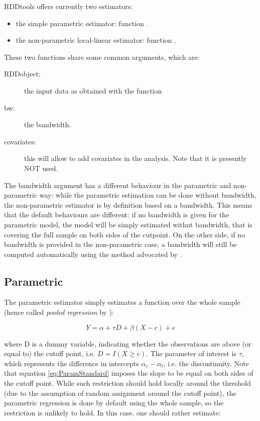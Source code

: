 \documentclass[english,nojss]{jss}\usepackage{graphicx, color}
\begin{document}

RDDtools offers currently two estimators:
\begin{itemize}
\item the simple parametric estimator: function . 
\item the non-parametric local-linear estimator: function . 
\end{itemize}
These two functions share some common arguments, which are:
\begin{description}
\item [{RDDobject:}] the input data as obtained with the 
function
\item [{bw:}] the bandwidth. 
\item [{covariates:}] this will allow to add covariates in the analysis.
Note that it is presently NOT used. 
\end{description}
The bandwidth argument has a different behaviour in the parametric
and non-parametric way: while the parametric estimation can be done
without bandwidth, the non-parametric estimator is by definition based
on a bandwidth. This means that the default behaviours are different:
if no bandwidth is given for the parametric model, the model will
be simply estimated withut bandwidth, that is covering the full sample
on both sides of the cutpoint. On the other side, if no bandwidth
is provided in the non-parametric case, a bandwidth will still be
computed automatically using the method advocated by \citet{ImbensKalyanaraman2012}. 


\subsection{Parametric}

The parametric estimator simply estimates a function over the whole
sample (hence called \emph{pooled regression} by \citealp{LeeLemieux2010}):

\begin{equation}
Y=\alpha+\tau D+\beta(X-c)+\epsilon\label{eq:ParamStandard}
\end{equation}


where D is a dummy variable, indicating whether the observations are
above (or equal to) the cutoff point, i.e. $D=I(X\geq c)$. The parameter
of interest is $\tau$, which represents the difference in intercepts
$\alpha_{r}-\alpha_{l}$, i.e. the discontinuity. Note that equation
\ref{eq:ParamStandard} imposes the slope to be equal on both sides
of the cutoff point. While such restriction should hold locally around
the threshold (due to the assumption of random assignment around the
cutoff point), the parametric regression is done by default using
the whole sample, so the restriction is unlikely to hold. In this
case, one should rather estimate:
\end{document}
